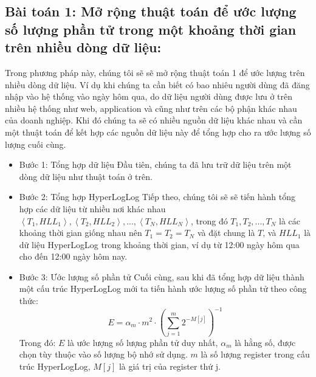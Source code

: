 \documentclass[letterpaper,13pt]{article}
\theoremstyle{mytheor}
\begin{document}
\subsection{\textbf{Bài toán 1:} Mở rộng thuật toán để ước lượng số lượng phần tử trong một khoảng thời gian trên nhiều dòng dữ liệu:}
Trong phương pháp này, chúng tôi sẽ sẽ mở rộng thuật toán 1 để ước lượng trên nhiều dòng dữ liệu. Ví dụ khi chúng ta cần biết có bao nhiêu người dùng
đã đăng nhập vào hệ thống vào ngày hôm qua, do dữ liệu người dùng được lưu ở trên nhiều hệ thống như web, application và cũng như trên các bộ phận khác nhau
của doanh nghiệp. Khi đó chúng ta sẽ có nhiều nguồn dữ liệu khác nhau và cần một thuật toán để kết hợp các nguồn dữ liệu này để tổng hợp cho ra ước lượng
số lượng cuối cùng.
\begin{itemize}
    \item Bước 1: Tổng hợp dữ liệu
    Đầu tiên, chúng ta đã lưu trữ dữ liệu trên một dòng dữ liệu như thuật toán ở trên. 
    \item Bước 2: Tổng hợp HyperLogLog
    Tiếp theo, chúng tôi sẽ sẽ tiến hành tổng hợp các dữ liệu từ nhiều nơi khác nhau $\left< T_1, HLL_1\right>, \left< T_2, HLL_2\right>,...,\left< T_N, HLL_N\right>$, 
    trong đó $T_1, T_2,...,T_N$ là các khoảng thời gian giống nhau nên $T_1 = T_2 = T_N$ và đặt chung là $T$, và $HLL_1$ là dữ liệu HyperLogLog trong khoảng thời gian, ví dụ
    từ 12:00 ngày hôm qua cho đến 12:00 ngày hôm nay.  
    \item Bước 3: Ước lượng số phần tử
    Cuối cùng, sau khi đã tổng hợp dữ liệu thành một cấu trúc HyperLogLog mới ta tiến hành ước lượng số phần tử theo công thức:
    \[E = \alpha_m \cdot m^2 \cdot \left( \sum_{j=1}^{m} 2^{-M[j]} \right)^{-1}\]
    Trong đó: $E$ là ước lượng số lượng phần tử duy nhất, 
    $\alpha_m$ là hằng số, được chọn tùy thuộc vào số lượng bộ nhớ sử dụng.
    $m$ là số lượng register trong cấu trúc HyperLogLog, $M[j]$ là giá trị của register thứ j.

\end{itemize}
\end{document}
